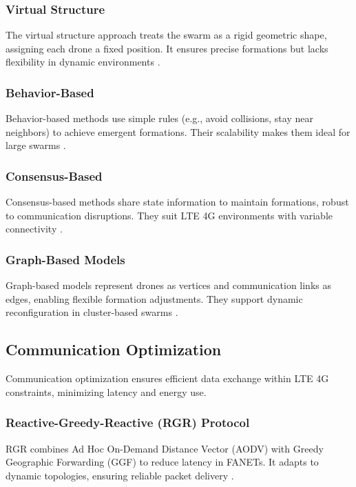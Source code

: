 \documentclass{article}
\begin{document}
\subsubsection{Virtual Structure}
The virtual structure approach treats the swarm as a rigid geometric shape, assigning each drone a fixed position. It ensures precise formations but lacks flexibility in dynamic environments \cite{Lewis1997, Ren2008}.

\subsubsection{Behavior-Based}
Behavior-based methods use simple rules (e.g., avoid collisions, stay near neighbors) to achieve emergent formations. Their scalability makes them ideal for large swarms \cite{Balch1998, Reynolds2000}.

\subsubsection{Consensus-Based}
Consensus-based methods share state information to maintain formations, robust to communication disruptions. They suit LTE 4G environments with variable connectivity \cite{Ren2007b, Dong2016}.

\subsubsection{Graph-Based Models}
Graph-based models represent drones as vertices and communication links as edges, enabling flexible formation adjustments. They support dynamic reconfiguration in cluster-based swarms \cite{Zavlanos2007, Mesbahi2010}.

\subsection{Communication Optimization}
Communication optimization ensures efficient data exchange within LTE 4G constraints, minimizing latency and energy use.

\subsubsection{Reactive-Greedy-Reactive (RGR) Protocol}
RGR combines Ad Hoc On-Demand Distance Vector (AODV) with Greedy Geographic Forwarding (GGF) to reduce latency in FANETs. It adapts to dynamic topologies, ensuring reliable packet delivery \cite{Li2016, Zhang2018b}.
\end{document}
